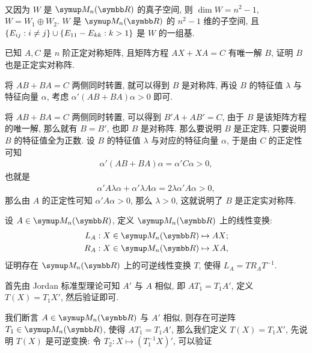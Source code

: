\begin{exercise}[resume=exer]
\begin{answer}
\begin{align*}
            \end{align*}
            又因为 $ W $ 是 $ \MM $ 的真子空间, 则 $ \dim W = n^{2} - 1 $, $ W = W_{1} \oplus W_{2} $. 
            $ W $ 是 $ \MM $ 的 $ n^{2} - 1 $ 维的子空间, 且 $ \qty{E_{ij} : i \ne j} \cup \qty{E_{11} - E_{kk} : k > 1} $ 是 $ W $ 的一组基.
        \end{answer}
        \item 已知 $ A, C $ 是 $ n $ 阶正定对称矩阵, 且矩阵方程 $ AX + XA = C $ 有唯一解 $ B $, 证明 $ B $ 也是正定实对称阵. 
        \begin{hint}
            将 $ AB + BA = C $ 两侧同时转置, 就可以得到 $ B $ 是对称阵, 再设 $ B $ 的特征值 $ \lambda $ 与特征向量 $ \alpha $, 考虑 $ \alpha'(AB + BA)\alpha > 0 $ 即可.
        \end{hint}
        \begin{answer}
            将 $ AB + BA = C $ 两侧同时转置, 可以得到 $ B'A + AB' = C $, 由于 $ B $ 是该矩阵方程的唯一解, 那么就有 $ B = B' $, 也即 $ B $ 是对称阵. 那么要说明 $ B $ 是正定阵, 只要说明 $ B $ 的特征值全为正数. 设 $ B $ 的特征值 $ \lambda $ 与对应的特征向量 $ \alpha $, 于是由 $ C $ 的正定性可知
            \begin{align*}
                \alpha'(AB + BA)\alpha = \alpha'C\alpha > 0,
            \end{align*}
            也就是
            \begin{align*}
                \alpha'A\lambda\alpha + \alpha'\lambda A\alpha = 2\lambda\alpha' A\alpha > 0,
            \end{align*}
            那么由 $ A $ 的正定性可知 $ \alpha' A\alpha > 0 $, 那么 $ \lambda > 0 $, 这就说明了 $ B $ 是正定实对称阵. 
        \end{answer}
        \item 设 $ A \in \MM $, 定义 $ \MM $ 上的线性变换:
        \begin{align*}
            L_{A} : X \in \MM \mapsto AX;\\
            R_{A} : X \in \MM \mapsto XA,
        \end{align*}
        证明存在 $ \MM $ 上的可逆线性变换 $ T $, 使得 $ L_{A} = TR_{A}T^{-1} $.
        \begin{hint}
            首先由 Jordan 标准型理论可知 $ A' $ 与 $ A $ 相似, 即 $ AT_{1} = T_{1}A' $, 定义 $ T(X) = T_{1}X' $, 然后验证即可. 
        \end{hint}
        \begin{answer}
            我们断言 $ A \in \MM $ 与 $ A' $ 相似, 则存在可逆阵 $ T_{1} \in \MM $, 使得 $ AT_{1} = T_{1}A' $, 那么我们定义 $ T(X) = T_{1}X' $, 先说明 $ T(X) $ 是可逆变换: 令 $ T_{2} : X \mapsto (T^{-1}_{1}X)' $, 可以验证

\end{answer}
\end{exercise}
